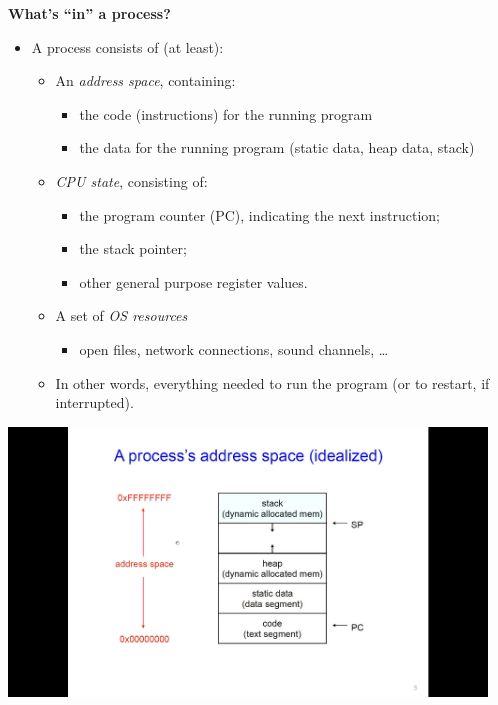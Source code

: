 \documentclass[11pt,a4paper]{article}
\begin{document}
\textbf{What's ``in'' a process?}
\begin{itemize}
    \item A process consists of (at least):
        \begin{itemize}
            \item An \emph{address space}, containing:
                \begin{itemize}
                    \item the code (instructions) for the running program
                    \item the data for the running program (static data, heap data, stack)
                \end{itemize}
            \item \emph{CPU state}, consisting of:
                \begin{itemize}
                    \item the program counter (PC), indicating the next instruction;
                    \item the stack pointer;
                    \item other general purpose register values.
                \end{itemize}
            \item A set of \emph{OS resources}
                \begin{itemize}
                    \item open files, network connections, sound channels, \dots
                \end{itemize}
            \item In other words, everything needed to run the program
                (or to restart, if interrupted).
        \end{itemize}
\end{itemize}

\includegraphics[height=270]{a-process-address-space.jpg}
\end{document}
